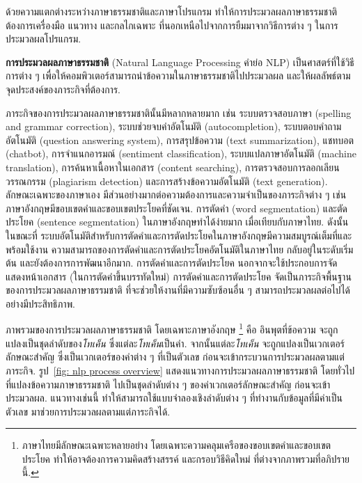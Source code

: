 ด้วยความแตกต่างระหว่างภาษาธรรมชาติและภาษาโปรแกรม
ทำให้การประมวลผลภาษาธรรมชาติต้องการเครื่องมือ แนวทาง และกลไกเฉพาะ
ที่นอกเหนือไปจากการยืมมาจากวิธีการต่าง ๆ ในการประมวลผลโปรแกรม.

\textbf{การประมวลผลภาษาธรรมชาติ} (Natural Language Processing คำย่อ NLP)
เป็นศาสตร์ที่ใช้วิธีการต่าง ๆ เพื่อให้คอมพิวเตอร์สามารถนำข้อความในภาษาธรรมชาติไปประมวลผล และให้ผลลัพธ์ตามจุดประสงค์ของภาระกิจที่ต้องการ.

ภาระกิจของการประมวลผลภาษาธรรมชาตินั้นมีหลากหลายมาก 
เช่น 
ระบบตรวจสอบภาษา (spelling and grammar correction),
ระบบช่วยจบคำอัตโนมัติ (autocompletion),
ระบบตอบคำถามอัตโนมัติ (question answering system),
การสรุปข้อความ (text summarization),
แชทบอต (chatbot),
การจำแนกอารมณ์ (sentiment classification),
ระบบแปลภาษาอัตโนมัติ (machine translation),
การค้นหาเนื้อหาในเอกสาร (content searching),
การตรวจสอบการลอกเลียนวรรณกรรม (plagiarism detection)
และการสร้างข้อความอัตโนมัติ (text generation).
ลักษณะเฉพาะของภาษาเอง มีส่วนอย่างมากต่อความต้องการและความจำเป็นของภาระกิจต่าง ๆ
เช่น
ภาษาอังกฤษมีขอบเขตคำและขอบเขตประโยคที่ชัดเจน.
การตัดคำ (word segmentation) และตัดประโยค (sentence segmentation) ในภาษาอังกฤษทำได้ง่ายมาก
เมื่อเทียบกับภาษาไทย.
ดังนั้นในขณะที่ ระบบอัตโนมัติสำหรับการตัดคำและการตัดประโยคในภาษาอังกฤษมีความสมบูรณ์เต็มที่และพร้อมใช้งาน
ความสามารถของการตัดคำและการตัดประโยคอัตโนมัติในภาษาไทย กลับอยู่ในระดับเริ่มต้น และยังต้องการการพัฒนาอีกมาก.
การตัดคำและการตัดประโยค นอกจากจะใช้ประกอบการจัดแสดงหน้าเอกสาร (ในการตัดคำขึ้นบรรทัดใหม่)
การตัดคำและการตัดประโยค จัดเป็นภาระกิจพื้นฐานของการประมวลผลภาษาธรรมชาติ ที่จะช่วยให้งานที่มีความซับซ้อนอื่น ๆ สามารถประมวลผลต่อไปได้อย่างมีประสิทธิภาพ.

ภาพรวมของการประมวลผลภาษาธรรมชาติ
โดยเฉพาะภาษาอังกฤษ%
\footnote{%
ภาษาไทยมีลักษณะเฉพาะหลายอย่าง
โดยเฉพาะความคลุมเครือของขอบเขตคำและขอบเขตประโยค
ทำให้อาจต้องการความคิดสร้างสรรค์ และกรอบวิธีคิดใหม่ ที่ต่างจากภาพรวมที่อภิปรายนี้.
}
คือ
อินพุตที่ข้อความ
จะถูกแปลงเป็นชุดลำดับของ\textit{โทเค็น} ซึ่งแต่ละ\textit{โทเค็น}เป็นคำ.
จากนั้นแต่ละ\textit{โทเค็น} จะถูกแปลงเป็นเวกเตอร์ลักษณะสำคัญ ซึ่งเป็นเวกเตอร์ของค่าต่าง ๆ ที่เป็นตัวเลข
ก่อนจะเข้ากระบวนการประมวลผลตามแต่ภาระกิจ.
รูป~\ref{fig: nlp process overview} แสดงแนวทางการประมวลผลภาษาธรรมชาติ
โดยทั่วไป ที่แปลงข้อความภาษาธรรมชาติ ไปเป็นชุดลำดับต่าง ๆ ของค่าเวกเตอร์ลักษณะสำคัญ ก่อนจะเข้าประมวลผล.
แนวทางเช่นนี้
ทำให้สามารถใช้แบบจำลองเชิงลำดับต่าง ๆ ที่ทำงานกับข้อมูลที่มีค่าเป็นตัวเลข มาช่วยการประมวลผลตามแต่ภาระกิจได้.

